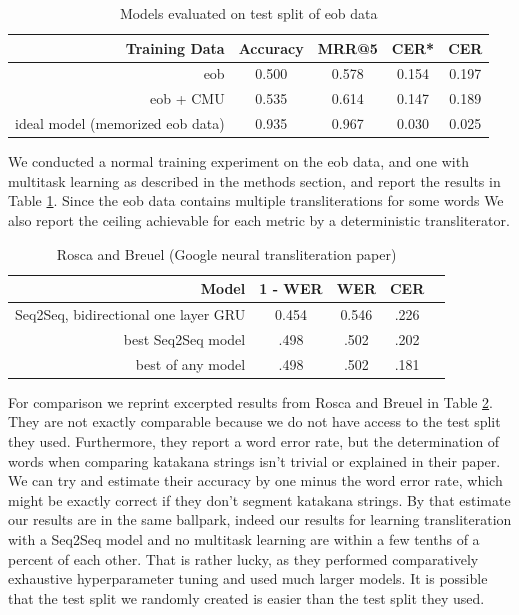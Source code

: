 \documentclass{article}
\begin{document}
\begin{table}[h]
  \centering
  \begin{tabular}{r | c c c c}
    \toprule
    Training Data & Accuracy & MRR@5 & CER* & CER \\
    \midrule
    eob & 0.500 & 0.578 & 0.154 & 0.197 \\
    eob + CMU & 0.535 & 0.614 & 0.147 & 0.189 \\
    \midrule
    ideal model (memorized eob data) & 0.935 & 0.967 & 0.030 & 0.025 \\
    \bottomrule
  \end{tabular}
  \caption{Models evaluated on test split of eob data}
  \label{tab:eob-results}
\end{table}

We conducted a normal training experiment on the eob data,
and one with multitask learning as described in the methods section,
and report the results in Table \ref{tab:eob-results}.
Since the eob data contains multiple transliterations for some words
We also report the ceiling achievable for each metric
by a deterministic transliterator.

\begin{table}[h]
  \centering
  \begin{tabular}{r | c c c c}
    \toprule
    Model & 1 - WER & WER & CER \\
    \midrule{}
    Seq2Seq, bidirectional one layer GRU & 0.454 & 0.546 & .226 \\
    best Seq2Seq model & .498 & .502 & .202 \\
    best of any model & .498 & .502 & .181 \\
    \bottomrule
  \end{tabular}
  \caption{Rosca and Breuel \cite{Rosca2016SequencetosequenceNN} (Google neural
    transliteration paper)}
  \label{tab:baseline-results}
\end{table}

For comparison we reprint excerpted results
from Rosca and Breuel \cite{Rosca2016SequencetosequenceNN}
in Table \ref{tab:baseline-results}.
They are not exactly comparable
because we do not have access to the test split they used.
Furthermore,
they report a word error rate,
but the determination of words when comparing katakana strings
isn't trivial or explained in their paper.
We can try and estimate their accuracy
by one minus the word error rate,
which might be exactly correct if they don't segment katakana strings.
By that estimate our results are in the same ballpark,
indeed our results for learning transliteration
with a Seq2Seq model and no multitask learning
are within a few tenths of a percent of each other.
That is rather lucky,
as they performed comparatively exhaustive hyperparameter tuning
and used much larger models.
It is possible that the test split we randomly created
is easier than the test split they used.
\end{document}
